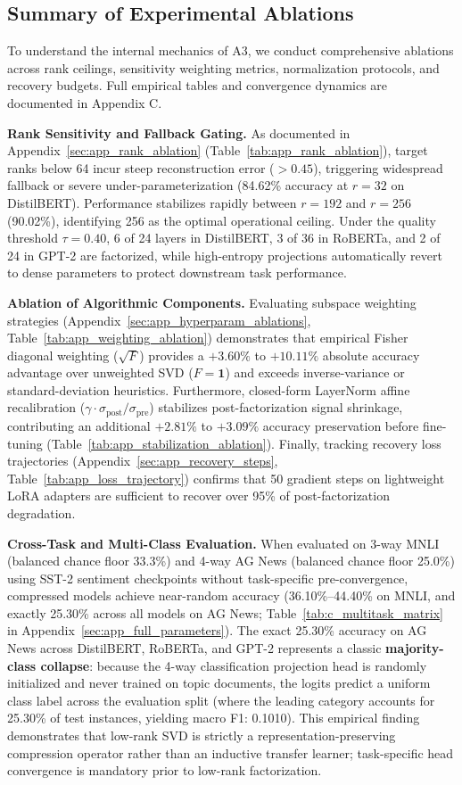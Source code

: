 \subsection{Summary of Experimental Ablations}

To understand the internal mechanics of A3, we conduct comprehensive ablations across rank ceilings, sensitivity weighting metrics, normalization protocols, and recovery budgets. Full empirical tables and convergence dynamics are documented in Appendix C.

\textbf{Rank Sensitivity and Fallback Gating.} As documented in Appendix~\ref{sec:app_rank_ablation} (Table~\ref{tab:app_rank_ablation}), target ranks below 64 incur steep reconstruction error ($> 0.45$), triggering widespread fallback or severe under-parameterization (84.62\% accuracy at $r=32$ on DistilBERT). Performance stabilizes rapidly between $r=192$ and $r=256$ (90.02\%), identifying 256 as the optimal operational ceiling. Under the quality threshold $\tau = 0.40$, 6 of 24 layers in DistilBERT, 3 of 36 in RoBERTa, and 2 of 24 in GPT-2 are factorized, while high-entropy projections automatically revert to dense parameters to protect downstream task performance.

\textbf{Ablation of Algorithmic Components.} Evaluating subspace weighting strategies (Appendix~\ref{sec:app_hyperparam_ablations}, Table~\ref{tab:app_weighting_ablation}) demonstrates that empirical Fisher diagonal weighting ($\sqrt{F}$) provides a $+3.60\%$ to $+10.11\%$ absolute accuracy advantage over unweighted SVD ($F=\mathbf{1}$) and exceeds inverse-variance or standard-deviation heuristics. Furthermore, closed-form LayerNorm affine recalibration ($\gamma \cdot \sigma_\text{post}/\sigma_\text{pre}$) stabilizes post-factorization signal shrinkage, contributing an additional $+2.81\%$ to $+3.09\%$ accuracy preservation before fine-tuning (Table~\ref{tab:app_stabilization_ablation}). Finally, tracking recovery loss trajectories (Appendix~\ref{sec:app_recovery_steps}, Table~\ref{tab:app_loss_trajectory}) confirms that 50 gradient steps on lightweight LoRA adapters are sufficient to recover over 95\% of post-factorization degradation.

\textbf{Cross-Task and Multi-Class Evaluation.} When evaluated on 3-way MNLI (balanced chance floor 33.3\%) and 4-way AG News (balanced chance floor 25.0\%) using SST-2 sentiment checkpoints without task-specific pre-convergence, compressed models achieve near-random accuracy (36.10\%--44.40\% on MNLI, and exactly 25.30\% across all models on AG News; Table~\ref{tab:c_multitask_matrix} in Appendix~\ref{sec:app_full_parameters}). The exact 25.30\% accuracy on AG News across DistilBERT, RoBERTa, and GPT-2 represents a classic \textbf{majority-class collapse}: because the 4-way classification projection head is randomly initialized and never trained on topic documents, the logits predict a uniform class label across the evaluation split (where the leading category accounts for 25.30\% of test instances, yielding macro F1: 0.1010). This empirical finding demonstrates that low-rank SVD is strictly a representation-preserving compression operator rather than an inductive transfer learner; task-specific head convergence is mandatory prior to low-rank factorization.

